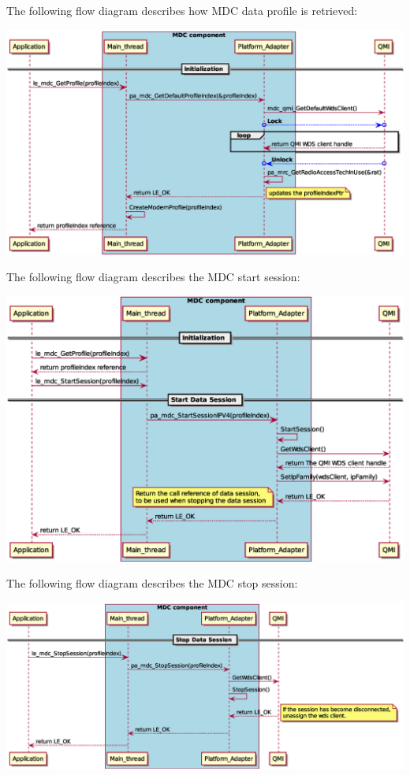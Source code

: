 The following flow diagram describes how M\+DC data profile is retrieved\+:


\begin{DoxyImageNoCaption}
  \mbox{\includegraphics[width=\textwidth,height=\textheight/2,keepaspectratio=true]{le_mdc_GetProfile}}
\end{DoxyImageNoCaption}


The following flow diagram describes the M\+DC start session\+:


\begin{DoxyImageNoCaption}
  \mbox{\includegraphics[width=\textwidth,height=\textheight/2,keepaspectratio=true]{le_mdc_StartSession}}
\end{DoxyImageNoCaption}


The following flow diagram describes the M\+DC stop session\+:


\begin{DoxyImageNoCaption}
  \mbox{\includegraphics[width=\textwidth,height=\textheight/2,keepaspectratio=true]{le_mdc_StopSession}}
\end{DoxyImageNoCaption}


